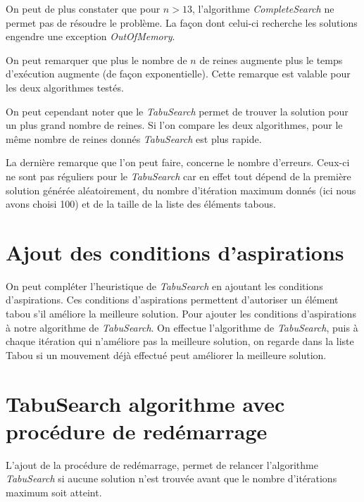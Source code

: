 \documentclass[a4paper,10pt]{article}
\begin{document}
On peut de plus constater que pour $n>13$, l'algorithme \emph{CompleteSearch} ne permet pas de résoudre le problème. La façon dont celui-ci recherche les solutions engendre une exception \emph{OutOfMemory}.

On peut remarquer que plus le nombre de $n$ de reines augmente plus le temps d'exécution augmente (de façon exponentielle). Cette remarque est valable pour les deux algorithmes testés.

On peut cependant noter que le \emph{TabuSearch} permet de trouver la solution pour un plus grand nombre de reines. Si l'on compare les deux algorithmes, pour le même nombre de reines donnés \emph{TabuSearch} est plus rapide.

La dernière remarque que l'on peut faire, concerne le nombre d'erreurs. Ceux-ci ne sont pas réguliers pour le \emph{TabuSearch} car en effet tout dépend de la première solution générée aléatoirement, du nombre d'itération maximum donnés (ici nous avons choisi 100) et de la taille de la liste des éléments tabous. 

\section{Ajout des conditions d'aspirations}
On peut compléter l'heuristique de \emph{TabuSearch} en ajoutant les conditions d'aspirations.
Ces conditions d'aspirations permettent d'autoriser un élément tabou s'il améliore la meilleure solution.
Pour ajouter les conditions d'aspirations à notre algorithme de \emph{TabuSearch}. On effectue l'algorithme de \emph{TabuSearch}, puis à chaque itération qui n'améliore pas la meilleure solution, on regarde dans la liste Tabou si un mouvement déjà effectué peut améliorer la meilleure solution.

\section{TabuSearch algorithme avec procédure de redémarrage}
L'ajout de la procédure de redémarrage, permet de relancer l'algorithme \emph{TabuSearch} si aucune solution n'est trouvée avant que le nombre d'itérations maximum soit atteint.
\end{document}
